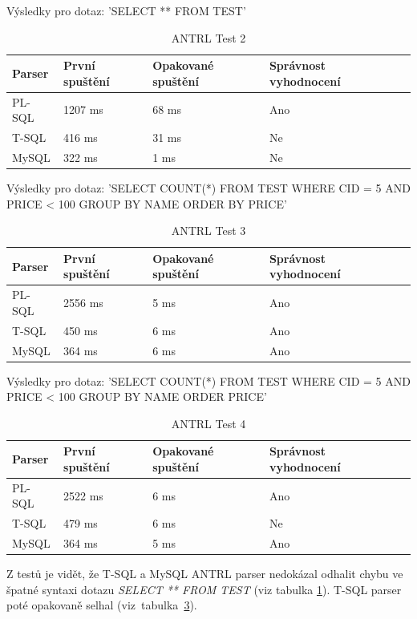 \documentclass[czech,bachelor,public,dept460,male,cpdeclaration,twoside]{diploma}
\begin{document}
\begin{table}[!htbp]
	\centering
	\caption{ANTRL Test 2}
	Výsledky pro dotaz: 'SELECT ** FROM TEST'
	\vskip 0.1cm
	\label{tab:antrl2}
	\begin{tabular}{lllll}
		\toprule
		Parser & První spuštění & Opakované spuštění & Správnost vyhodnocení\\
		\midrule
		PL-SQL & 1207 ms & 68 ms & Ano \\
        T-SQL & 416 ms &31 ms & Ne \\
        MySQL & 322 ms & 1 ms & Ne \\
		\midrule
	\end{tabular}
\end{table}

\begin{table}[!htbp]
	\centering
	\caption{ANTRL Test 3}
	Výsledky pro dotaz: 'SELECT COUNT(*) FROM TEST WHERE CID = 5 AND PRICE < 100 GROUP BY NAME ORDER BY PRICE'
	\vskip 0.1cm
	\label{tab:antrl3}
	\begin{tabular}{lllll}
		\toprule
		Parser & První spuštění & Opakované spuštění & Správnost vyhodnocení\\
		\midrule
		PL-SQL & 2556 ms & 5 ms & Ano \\
        T-SQL & 450 ms & 6 ms & Ano \\
        MySQL & 364 ms & 6 ms & Ano \\
		\midrule
	\end{tabular}
\end{table}

\begin{table}[!htbp]
	\centering
	\caption{ANTRL Test 4}
	Výsledky pro dotaz: 'SELECT COUNT(*) FROM TEST WHERE CID = 5 AND PRICE < 100 GROUP BY NAME ORDER PRICE'
	\vskip 0.1cm
	\label{tab:antrl4}
	\begin{tabular}{lllll}
		\toprule
		Parser & První spuštění & Opakované spuštění & Správnost vyhodnocení\\
		\midrule
		PL-SQL & 2522 ms & 6 ms & Ano \\
        T-SQL & 479 ms & 6 ms & Ne \\
        MySQL & 364 ms & 5 ms & Ano \\
		\midrule
	\end{tabular}
\end{table}


Z testů je vidět, že T-SQL a MySQL ANTRL parser nedokázal odhalit chybu ve špatné syntaxi dotazu \textit{SELECT ** FROM TEST} (viz tabulka \ref{tab:antrl2}). T-SQL parser poté opakovaně selhal (viz~tabulka~\ref{tab:antrl4}).
\end{document}
